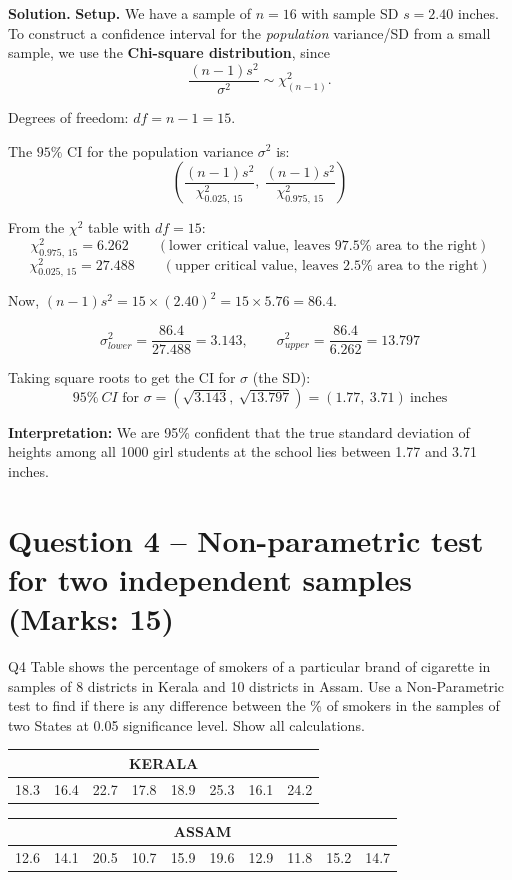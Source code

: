 \documentclass[11pt]{article}
\newcommand{\soln}{\par\noindent\textcolor{acolor}{\textbf{Solution.}}\quad}
\begin{document}
\soln
\textbf{Setup.} We have a sample of $n=16$ with sample SD $s=2.40$ inches. To construct a confidence interval for the \emph{population} variance/SD from a small sample, we use the \textbf{Chi-square distribution}, since
\[
\frac{(n-1)s^2}{\sigma^2} \sim \chi^2_{(n-1)}.
\]

Degrees of freedom: $df = n - 1 = 15$.

The $95\%$ CI for the population variance $\sigma^2$ is:
\[
\left(\frac{(n-1)s^2}{\chi^2_{0.025,\,15}},\ \frac{(n-1)s^2}{\chi^2_{0.975,\,15}}\right)
\]

From the $\chi^2$ table with $df=15$:
\[
\chi^2_{0.975,\,15} = 6.262 \qquad (\text{lower critical value, leaves } 97.5\% \text{ area to the right})
\]
\[
\chi^2_{0.025,\,15} = 27.488 \qquad (\text{upper critical value, leaves } 2.5\% \text{ area to the right})
\]

Now, $(n-1)s^2 = 15 \times (2.40)^2 = 15 \times 5.76 = 86.4$.

\[
\sigma^2_{lower} = \frac{86.4}{27.488} = 3.143, \qquad \sigma^2_{upper} = \frac{86.4}{6.262} = 13.797
\]

Taking square roots to get the CI for $\sigma$ (the SD):
\[
\boxed{95\%\ CI \text{ for } \sigma = (\sqrt{3.143},\ \sqrt{13.797}) = (1.77,\ 3.71)\ \text{inches}}
\]

\textbf{Interpretation:} We are 95\% confident that the true standard deviation of heights among all 1000 girl students at the school lies between 1.77 and 3.71 inches.

\section{Question 4 -- Non-parametric test for two independent samples (Marks: 15)}
\begin{question}{Q4}
Table shows the percentage of smokers of a particular brand of cigarette in samples of 8 districts in Kerala and 10 districts in Assam. Use a Non-Parametric test to find if there is any difference between the \% of smokers in the samples of two States at 0.05 significance level. Show all calculations.

\begin{center}
\begin{tabular}{cccccccc}
\multicolumn{8}{c}{\textbf{KERALA}} \\
\toprule
18.3 & 16.4 & 22.7 & 17.8 & 18.9 & 25.3 & 16.1 & 24.2 \\
\bottomrule
\end{tabular}

\vspace{0.5em}
\begin{tabular}{cccccccccc}
\multicolumn{10}{c}{\textbf{ASSAM}} \\
\toprule
12.6 & 14.1 & 20.5 & 10.7 & 15.9 & 19.6 & 12.9 & 11.8 & 15.2 & 14.7 \\
\bottomrule
\end{tabular}
\end{center}
\end{question}
\end{document}
